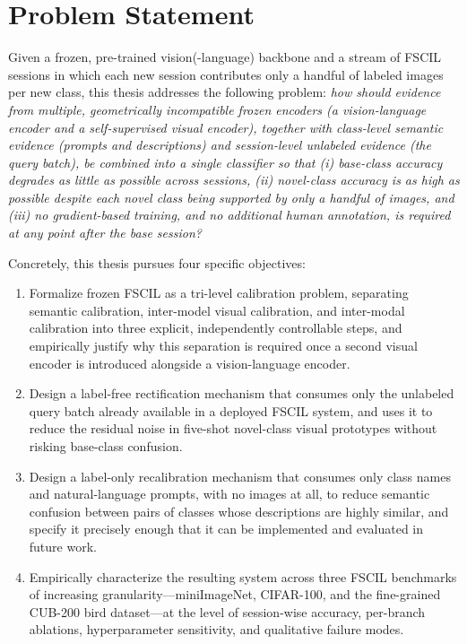 \documentclass{iutbscthesis}
\begin{document}
\section{Problem Statement}

Given a frozen, pre-trained vision(-language) backbone and a stream of FSCIL sessions in which each new session contributes only a handful of labeled images per new class, this thesis addresses the following problem: \emph{how should evidence from multiple, geometrically incompatible frozen encoders (a vision-language encoder and a self-supervised visual encoder), together with class-level semantic evidence (prompts and descriptions) and session-level unlabeled evidence (the query batch), be combined into a single classifier so that (i) base-class accuracy degrades as little as possible across sessions, (ii) novel-class accuracy is as high as possible despite each novel class being supported by only a handful of images, and (iii) no gradient-based training, and no additional human annotation, is required at any point after the base session?}

Concretely, this thesis pursues four specific objectives:
\begin{enumerate}
    \item Formalize frozen FSCIL as a tri-level calibration problem, separating semantic calibration, inter-model visual calibration, and inter-modal calibration into three explicit, independently controllable steps, and empirically justify why this separation is required once a second visual encoder is introduced alongside a vision-language encoder.
    \item Design a label-free rectification mechanism that consumes only the unlabeled query batch already available in a deployed FSCIL system, and uses it to reduce the residual noise in five-shot novel-class visual prototypes without risking base-class confusion.
    \item Design a label-only recalibration mechanism that consumes only class names and natural-language prompts, with no images at all, to reduce semantic confusion between pairs of classes whose descriptions are highly similar, and specify it precisely enough that it can be implemented and evaluated in future work.
    \item Empirically characterize the resulting system across three FSCIL benchmarks of increasing granularity---miniImageNet, CIFAR-100, and the fine-grained CUB-200 bird dataset---at the level of session-wise accuracy, per-branch ablations, hyperparameter sensitivity, and qualitative failure modes.
\end{enumerate}
\end{document}
